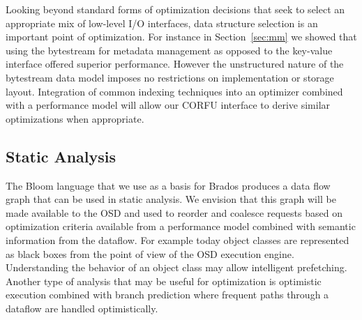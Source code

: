 Looking beyond standard forms of optimization decisions that seek to select
an appropriate mix of low-level I/O interfaces, data structure selection is an
important point of optimization. For instance in Section~\ref{sec:mm} we
showed that using the bytestream for metadata management as opposed to the
key-value interface offered superior performance. However the unstructured
nature of the bytestream data model imposes no restrictions on implementation
or storage layout. Integration of common indexing techniques into an optimizer
combined with a performance model will allow our CORFU interface to derive
similar optimizations when appropriate.

\subsection{Static Analysis}

The Bloom language that we use as a basis for Brados
produces a data flow graph that can be used in static analysis. We envision
that this graph will be made available to the OSD and used to reorder and
coalesce requests based on optimization criteria available from a performance
model combined with semantic information from the dataflow. For example today
object classes are represented as black boxes from the point of view of the
OSD execution engine.  Understanding the behavior of an object class may allow
intelligent prefetching. Another type of analysis that may be useful for
optimization is optimistic execution combined with branch prediction where
frequent paths through a dataflow are handled optimistically.
